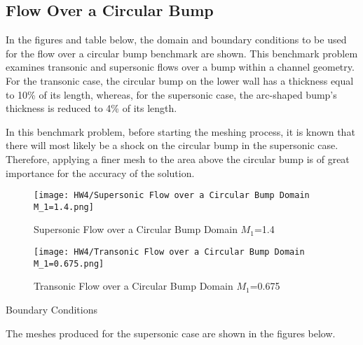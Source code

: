 \documentclass[a4paper, 12pt]{article}
\begin{document}
\subsection{Flow Over a Circular Bump}
In the figures and table below, the domain and boundary conditions to be used for the flow over a circular bump benchmark are shown. This benchmark problem examines transonic and supersonic flows over a bump within a channel geometry. For the transonic case, the circular bump on the lower wall has a thickness equal to 10\% of its length, whereas, for the supersonic case, the arc-shaped bump’s thickness is reduced to 4\% of its length. \par
In this benchmark problem, before starting the meshing process, it is known that there will most likely be a shock on the circular bump in the supersonic case. Therefore, applying a finer mesh to the area above the circular bump is of great importance for the accuracy of the solution.\\

\begin{figure}[H]
    \centering
    \texttt{[image: HW4/Supersonic Flow over a Circular Bump Domain M\_1=1.4.png]}
    \caption{Supersonic Flow over a Circular Bump Domain $M_1$=1.4}
\end{figure}

\begin{figure}[H]
    \centering
    \texttt{[image: HW4/Transonic Flow over a Circular Bump Domain M\_1=0.675.png]}
    \caption{Transonic Flow over a Circular Bump Domain $M_1$=0.675}
\end{figure}

\begin{table}[H]
    \renewcommand\baselinestretch{1.1}\selectfont
    \centering
    \mbox{}
    \caption{Boundary Conditions}
\end{table}
The meshes produced for the supersonic case are shown in the figures below.
\end{document}
